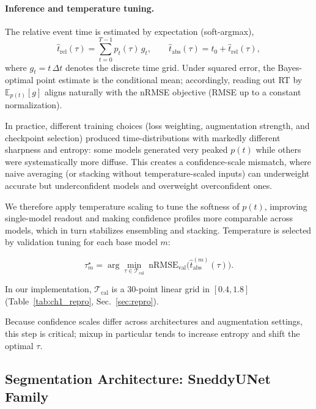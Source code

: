 \documentclass[12pt]{article}
\begin{document}
\paragraph{Inference and temperature tuning.}
The relative event time is estimated by expectation (soft-argmax),
\begin{equation}
\label{eq:rt_soft_argmax}
\hat t_{\mathrm{rel}}(\tau)=\sum_{t=0}^{T-1} p_t(\tau)\, g_t,
\qquad
\hat t_{\mathrm{abs}}(\tau)=t_0+\hat t_{\mathrm{rel}}(\tau),
\end{equation}
where $g_t=t\,\Delta t$ denotes the discrete time grid. Under squared error, the Bayes-optimal point estimate is the
conditional mean; accordingly, reading out RT by $\mathbb{E}_{p(t)}[g]$ aligns naturally with the nRMSE objective (RMSE
up to a constant normalization).

In practice, different training choices (loss weighting, augmentation strength, and checkpoint selection) produced
time-distributions with markedly different sharpness and entropy: some models generated very peaked $p(t)$ while others
were systematically more diffuse. This creates a confidence-scale mismatch, where naive averaging (or stacking without
temperature-scaled inputs) can underweight accurate but underconfident models and overweight overconfident ones.

We therefore apply temperature scaling \citep{guo2017calibration} to tune the softness of $p(t)$, improving single-model
readout and making confidence profiles more comparable across models, which in turn stabilizes ensembling and stacking.
Temperature is selected by validation tuning for each base model $m$:

\begin{equation}
\label{eq:rt_tau_tuning}
\tau_m^\star = \arg\min_{\tau\in\mathcal{T}_{\text{cal}}}
\ \mathrm{nRMSE}_{\text{val}}\big(\hat t_{\mathrm{abs}}^{(m)}(\tau)\big).
\end{equation}

In our implementation, $\mathcal{T}_{\text{cal}}$ is a 30-point linear grid in $[0.4,1.8]$ (Table~\ref{tab:ch1_repro}, Sec.~\ref{sec:repro}).

Because confidence scales differ across architectures and augmentation settings, this step is critical; mixup in
particular tends to increase entropy and shift the optimal $\tau$.



\subsection{Segmentation Architecture: SneddyUNet Family}
\label{sec:sneddyunet}
\end{document}
